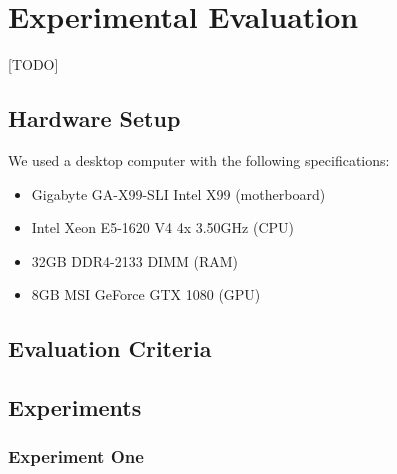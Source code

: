 \section{Experimental Evaluation}
\label{sec:exp_eval}
[TODO]

\subsection{Hardware Setup}
\label{exp_eval:hardware}
We used a desktop computer with the following specifications:
\begin{itemize}
	\item Gigabyte GA-X99-SLI Intel X99 (motherboard)
	\item Intel Xeon E5-1620 V4 4x 3.50GHz (CPU)
	\item 32GB DDR4-2133 DIMM (RAM) 
	\item 8GB MSI GeForce GTX 1080 (GPU)
\end{itemize}

\subsection{Evaluation Criteria}
\label{exp_eval:eval_criteria}

	
\subsection{Experiments}
\label{exp_eval:experiments}


\subsubsection{Experiment One}
\label{experiment:experiment_one}


